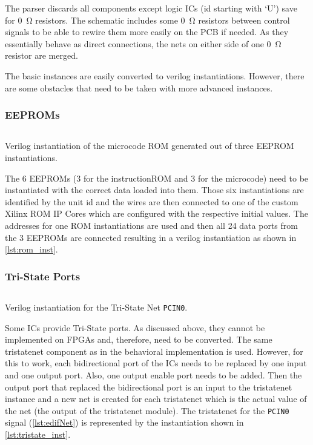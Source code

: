 The parser discards all components except logic \glspl{IC} (id starting with `U') save for \qty{0}{\ohm} resistors.
The schematic includes some \qty{0}{\ohm} resistors between control signals to be able to rewire them more easily on the \gls{PCB} if needed.
As they essentially behave as direct connections, the nets on either side of one \qty{0}{\ohm} resistor are merged.

The basic instances are easily converted to verilog instantiations.
However, there are some obstacles that need to be taken with more advanced instances.
\subsubsection{\glspl{EEPROM}}
\begin{listing}[t]
  \inputminted[linenos,
    breaklines,
    firstline=1364,
    lastline=1368,
    frame=leftline,
    xleftmargin=20pt,
  ]{Verilog}{src/generated.v}
  \caption{Verilog instantiation of the microcode ROM generated out of three \gls{EEPROM} instantiations.}
  \label{lst:rom_inst}
\end{listing}
The 6 \glspl{EEPROM} (3 for the instructionROM and 3 for the microcode) need to be instantiated with the correct data loaded into them.
Those six instantiations are identified by the unit id and the wires are then connected to one of the custom Xilinx ROM IP Cores which are configured with the respective initial values.
The addresses for one ROM instantiations are used and then all 24 data ports from the 3 \glspl{EEPROM} are connected resulting in a verilog instantiation as shown in \cref{lst:rom_inst}.
\subsubsection{Tri-State Ports}
\begin{listing}[t]
  \inputminted[linenos,
    breaklines,
    firstline=1794,
    lastline=1801,
    frame=leftline,
    xleftmargin=20pt,
  ]{Verilog}{src/generated.v}
\caption{Verilog instantiation for the Tri-State Net \texttt{PCIN0}.}
  \label{lst:tristate_inst}
\end{listing}
Some \glspl{IC} provide Tri-State ports.
As discussed above, they cannot be implemented on \glspl{FPGA} and, therefore, need to be converted.
The same tristatenet component as in the behavioral implementation is used.
However, for this to work, each bidirectional port of the \glspl{IC} needs to be replaced by one input and one output port.
Also, one output enable port needs to be added.
Then the output port that replaced the bidirectional port is an input to the tristatenet instance and a new net is created for each tristatenet which is the actual value of the net (the output of the tristatenet module).
The tristatenet for the \texttt{PCIN0} signal (\cref{lst:edifNet}) is represented by the instantiation shown in \cref{lst:tristate_inst}.

